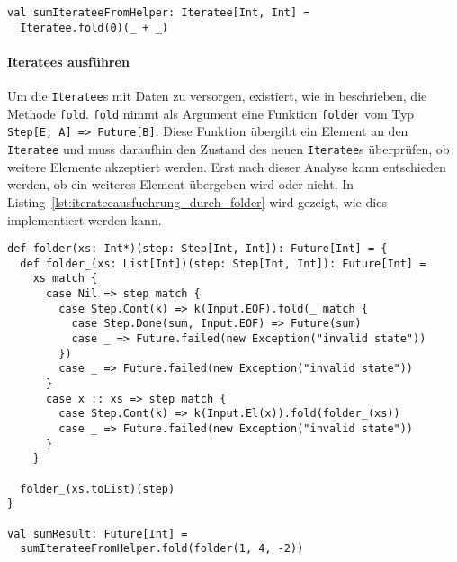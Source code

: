 \documentclass[draft=false
              ,paper=a4
              ,twoside=false
              ,fontsize=11pt
              ,headsepline
              ,BCOR10mm
              ,DIV11
              ]{scrbook}
\begin{document}
\begin{lstlisting}[caption=Erstellung eines Iteratees durch Konstruktormethode im Companion-Objekt, label=lst:iteratee_durch_hilfsmethode]
val sumIterateeFromHelper: Iteratee[Int, Int] =
  Iteratee.fold(0)(_ + _)
\end{lstlisting}



\paragraph{Iteratees ausführen} %
\label{par:iteratees_ausfuehren}\mbox{} %

Um die \lstinline|Iteratee|s mit Daten zu versorgen, existiert, wie in  beschrieben, die Methode \lstinline|fold|.
\lstinline|fold| nimmt als Argument eine Funktion \lstinline|folder| vom Typ \lstinline[breaklines=true]|Step[E, A] => Future[B]|.
Diese Funktion übergibt ein Element an den \lstinline|Iteratee| und muss daraufhin den Zustand des neuen \lstinline|Iteratee|s überprüfen, ob weitere Elemente akzeptiert werden.
Erst nach dieser Analyse kann entschieden werden, ob ein weiteres Element übergeben wird oder nicht.
In Listing~\ref{lst:iterateeausfuehrung_durch_folder} wird gezeigt, wie dies implementiert werden kann.

\begin{lstlisting}[caption=Ausführung eines Iteratees durch folder-Funktion, label=lst:iterateeausfuehrung_durch_folder]
def folder(xs: Int*)(step: Step[Int, Int]): Future[Int] = {
  def folder_(xs: List[Int])(step: Step[Int, Int]): Future[Int] =
    xs match {
      case Nil => step match {
        case Step.Cont(k) => k(Input.EOF).fold(_ match {
          case Step.Done(sum, Input.EOF) => Future(sum)
          case _ => Future.failed(new Exception("invalid state"))
        })
        case _ => Future.failed(new Exception("invalid state"))
      }
      case x :: xs => step match {
        case Step.Cont(k) => k(Input.El(x)).fold(folder_(xs))
        case _ => Future.failed(new Exception("invalid state"))
      }
    }

  folder_(xs.toList)(step)
}

val sumResult: Future[Int] =
  sumIterateeFromHelper.fold(folder(1, 4, -2))
\end{lstlisting}
\end{document}
